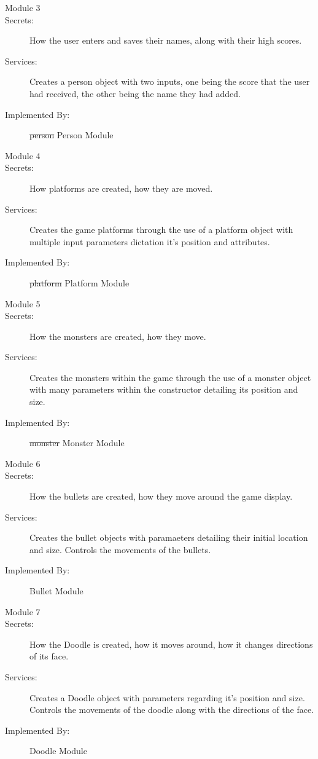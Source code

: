 \documentclass[12pt, titlepage]{article}
\newcommand{\rev}[1]{\textcolor{RevisionColour}{#1}}
\begin{document}
\begin{description}
\item[Module 3]
\item[Secrets:]How the user enters and saves their names, along with their high scores.
\item[Services:]Creates a person object with two inputs, one being the score that the user had received, the other being the name they had added.
\item[Implemented By:] \sout{person} \rev{Person} Module
\end{description}

\begin{description}
\item[Module 4]
\item[Secrets:]How platforms are created, how they are moved.
\item[Services:]Creates the game platforms through the use of a platform object with multiple input parameters dictation it's position and attributes.
\item[Implemented By:] \sout{platform} \rev{Platform} Module
\end{description}

\begin{description}
\item[Module 5]
\item[Secrets:]How the monsters are created, how they move.
\item[Services:]Creates the monsters within the game through the use of a monster object with many parameters within the constructor detailing its position and size. 
\item[Implemented By:] \sout{monster} \rev{Monster} Module
\end{description}

\begin{description}
\item[Module 6]
\item[Secrets:]How the bullets are created, how they move around the game display. 
\item[Services:]Creates the bullet objects with paramaeters detailing their initial location and size. Controls the movements of the bullets.
\item[Implemented By:] Bullet Module
\end{description}

\begin{description}
\item[Module 7]
\item[Secrets:]How the Doodle is created, how it moves around, how it changes directions of its face.
\item[Services:]Creates a Doodle object with parameters regarding it's position and size. Controls the movements of the doodle along with the directions of the face.
\item[Implemented By:] Doodle Module
\end{description}
\end{document}
